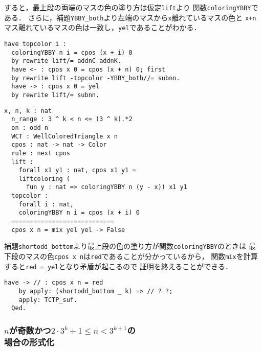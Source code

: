 すると，最上段の両端のマスの色の塗り方は仮定{\tt{lift}}より
関数{\tt{coloringYBBY}}である．
さらに，補題{\tt{YBBY\_both}}より左端のマスから{\tt{x}}離れているマスの色と
{\tt{x+n}}マス離れているマスの色は一致し，{\tt{yel}}であることがわかる．
\begin{lstlisting}[language=Coq]
  have topcolor i :
  coloringYBBY n i = cpos (x + i) 0
  by rewrite lift/= addnC addnK.
  have <- : cpos x 0 = cpos (x + n) 0; first
  by rewrite lift -topcolor -YBBY_both//= subnn.
  have -> : cpos x 0 = yel
  by rewrite lift/= subnn.
\end{lstlisting}
\begin{lstlisting}[language=Coq]
  x, n, k : nat
  n_range : 3 ^ k < n <= (3 ^ k).*2
  on : odd n
  WCT : WellColoredTriangle x n
  cpos : nat -> nat -> Color
  rule : next cpos
  lift :
    forall x1 y1 : nat, cpos x1 y1 =
    liftcoloring (
      fun y : nat => coloringYBBY n (y - x)) x1 y1
  topcolor :
    forall i : nat,
    coloringYBBY n i = cpos (x + i) 0
  ============================
  cpos x n = mix yel yel -> False
\end{lstlisting}
補題{\tt{shortodd\_bottom}}より最上段の色の塗り方が関数{\tt{coloringYBBY}}のときは
最下段のマスの色{\tt{cpos x n}}は{\tt{red}}であることが分かっているから，
関数{\tt{mix}}を計算すると{\tt{red = yel}}となり矛盾が起こるので
証明を終えることができる．
\begin{lstlisting}[language=Coq]
    have -> // : cpos x n = red
    by apply: (shortodd_bottom _ k) => // ? ?;
    apply: TCTP_suf.
  Qed.
\end{lstlisting}

\subsubsection{$n$が奇数かつ$2 \cdot 3^{k} + 1 \leq n < 3^{k+1}$の\\場合の形式化}

